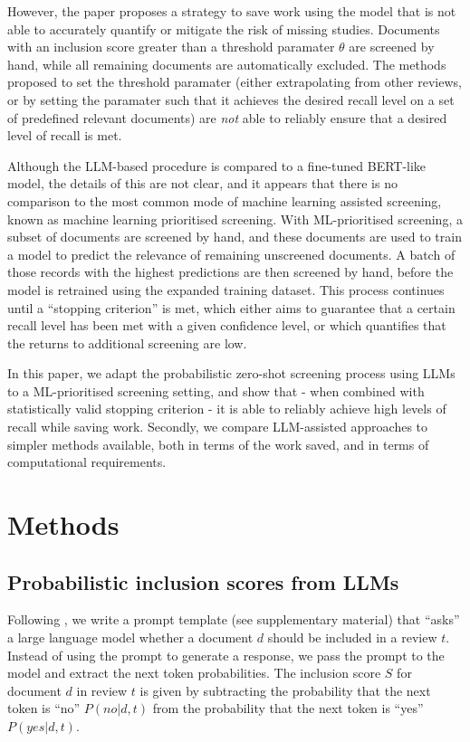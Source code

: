 \documentclass{article}
\begin{document}
	However, the paper proposes a strategy to save work using the model that is not able to accurately quantify or mitigate the risk of missing studies. Documents with an inclusion score greater than a threshold paramater $\theta$ are screened by hand, while all remaining documents are automatically excluded. The methods proposed to set the threshold paramater (either extrapolating from other reviews, or by setting the paramater such that it achieves the desired recall level on a set of predefined relevant documents) are \textit{not} able to reliably ensure that a desired level of recall is met. 
	
	Although the LLM-based procedure is compared to a fine-tuned BERT-like model, the details of this are not clear, and it appears that there is no comparison to the most common mode of machine learning assisted screening, known as machine learning prioritised screening. With ML-prioritised screening, a subset of documents are screened by hand, and these documents are used to train a model to predict the relevance of remaining unscreened documents. A batch of those records with the highest predictions are then screened by hand, before the model is retrained using the expanded training dataset. This process continues until a ``stopping criterion'' \cite{SneydS19, callaghan_statistical_2020, lewis_confidence_2023} is met, which either aims to guarantee that a certain recall level has been met with a given confidence level, or which quantifies that the returns to additional screening are low. 
	
	In this paper, we adapt the probabilistic zero-shot screening process using LLMs to a ML-prioritised screening setting, and show that - when combined with statistically valid stopping criterion - it is able to reliably achieve high levels of recall while saving work. Secondly, we compare LLM-assisted approaches to simpler methods available, both in terms of the work saved, and in terms of computational requirements.
	
	\section*{Methods}
	
	\subsection*{Probabilistic inclusion scores from LLMs}
	
	Following \cite{wang_zero-shot_2024}, we write a prompt template (see supplementary material) that ``asks'' a large language model whether a document $d$ should be included in a review $t$. Instead of using the prompt to generate a response, we pass the prompt to the model and extract the next token probabilities. The inclusion score $S$ for document $d$ in review $t$ is given by subtracting the probability that the next token is ``no'' $P(no|d,t)$ from the probability that the next token is ``yes'' $P(yes|d,t)$.
	
\end{document}
